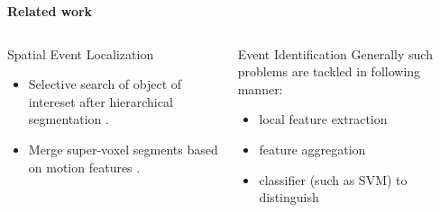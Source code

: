 \begin{frame}{\textbf{Related work}}
\begin{columns}
	\begin{column}{0.45\textwidth}
		\begin{varblock}[\textwidth]{Spatial Event Localization}
			\begin{itemize}							
				\item Selective search of object of intereset after hierarchical segmentation \cite{subwindowsearch}.
				\item Merge super-voxel segments based on motion features \cite{tubelets}.
			\end{itemize}
		\end{varblock}
	\end{column}
	\begin{column}{0.45\textwidth}
		\begin{varblock}[\textwidth]{Event Identification}
		 Generally such problems are tackled in following manner: 
			\begin{itemize}
				\item local feature extraction
				\item feature aggregation
				\item classifier (such as SVM) to distinguish
			\end{itemize}
		\end{varblock}
	\end{column}
\end{columns}	
\end{frame}
